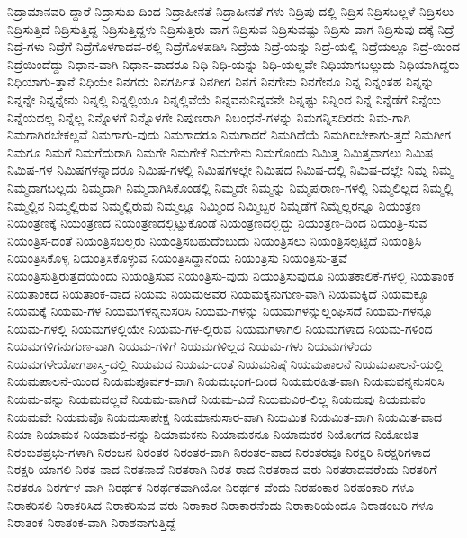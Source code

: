 {ನಿದ್ರಾಮಾನವರಿ-ದ್ದಾರೆ
ನಿದ್ರಾಸುಖ-ದಿಂದ
ನಿದ್ರಾಹೀನತೆ
ನಿದ್ರಾಹೀನತೆ-ಗಳು
ನಿದ್ರಿಪು-ದಲ್ಲಿ
ನಿದ್ರಿಸ
ನಿದ್ರಿಸಬಲ್ಲಳೆ
ನಿದ್ರಿಸಲು
ನಿದ್ರಿಸುತ್ತಿದೆ
ನಿದ್ರಿಸುತ್ತಿದ್ದ
ನಿದ್ರಿಸುತ್ತಿದ್ದಳು
ನಿದ್ರಿಸುತ್ತಿರು-ವಾಗ
ನಿದ್ರಿಸುವ
ನಿದ್ರಿಸುವಷ್ಟು
ನಿದ್ರಿಸು-ವಾಗ
ನಿದ್ರಿಸುವು-ದಕ್ಕೆ
ನಿದ್ರೆ
ನಿದ್ರೆ-ಗಳು
ನಿದ್ರೆಗೆ
ನಿದ್ರೆಗೊಳಗಾದವ-ರಲ್ಲಿ
ನಿದ್ರೆಗೊಳಪಡಿಸಿ
ನಿದ್ರೆಯ
ನಿದ್ರೆ-ಯನ್ನು
ನಿದ್ರೆ-ಯಲ್ಲಿ
ನಿದ್ರೆಯಲ್ಲೂ
ನಿದ್ರೆ-ಯಿಂದ
ನಿದ್ರೆಯಿಂದೆದ್ದು
ನಿಧಾನ-ವಾಗಿ
ನಿಧಾನ-ವಾದರೂ
ನಿಧಿ
ನಿಧಿ-ಯನ್ನು
ನಿಧಿ-ಯಲ್ಲವೇ
ನಿಧಿಯಾಗಬಲ್ಲುದು
ನಿಧಿಯಾಗಿದ್ದರು
ನಿಧಿಯಾಗು-ತ್ತಾನೆ
ನಿಧಿಯೇ
ನಿನಗದು
ನಿನಗರ್ಪಿತ
ನಿನಗೀಗ
ನಿನಗೆ
ನಿನಗೇನು
ನಿನಗೇನೂ
ನಿನ್ನ
ನಿನ್ನಂತಹ
ನಿನ್ನನ್ನು
ನಿನ್ನನ್ನೇ
ನಿನ್ನನ್ನೇನು
ನಿನ್ನಲ್ಲಿ
ನಿನ್ನಲ್ಲಿಯೂ
ನಿನ್ನಲ್ಲಿವೆಯೆ
ನಿನ್ನವನುನಿನ್ನವನೇ
ನಿನ್ನಷ್ಟು
ನಿನ್ನಿಂದ
ನಿನ್ನೆ
ನಿನ್ನೆಡೆಗೆ
ನಿನ್ನೆಯ
ನಿನ್ನೆಯದಲ್ಲ
ನಿನ್ನೆಲ್ಲ
ನಿನ್ನೊಳಗೆ
ನಿನ್ನೊಳಗೇ
ನಿಪುಣರಾಗಿ
ನಿಬಂಧನೆ-ಗಳನ್ನು
ನಿಮಗನ್ನಿಸದಿರದು
ನಿಮ-ಗಾಗಿ
ನಿಮಗಾಗಿರಬೇಕಲ್ಲವೆ
ನಿಮಗಾಗು-ವುದು
ನಿಮಗಾದರೂ
ನಿಮಗಾದರೆ
ನಿಮಗಿದೆಯೆ
ನಿಮಗಿರಬೇಕಾಗು-ತ್ತದೆ
ನಿಮಗೀಗ
ನಿಮಗೂ
ನಿಮಗೆ
ನಿಮಗೆದುರಾಗಿ
ನಿಮಗೇ
ನಿಮಗೇಕೆ
ನಿಮಗೇನು
ನಿಮಗೊಂದು
ನಿಮಿತ್ತ
ನಿಮಿತ್ತವಾಗಲು
ನಿಮಿಷ
ನಿಮಿಷ-ಗಳ
ನಿಮಿಷಗಳನ್ನಾದರೂ
ನಿಮಿಷ-ಗಳಲ್ಲಿ
ನಿಮಿಷಗಳಲ್ಲೇ
ನಿಮಿಷದ
ನಿಮಿಷ-ದಲ್ಲಿ
ನಿಮಿಷ-ದಲ್ಲೇ
ನಿಮ್ನ
ನಿಮ್ಮ
ನಿಮ್ಮದಾಗಬಲ್ಲದು
ನಿಮ್ಮದಾಗಿ
ನಿಮ್ಮದಾಗಿಸಿಕೊಂಡಲ್ಲಿ
ನಿಮ್ಮದೇ
ನಿಮ್ಮನ್ನು
ನಿಮ್ಮಪುರಾಣ-ಗಳಲ್ಲಿ
ನಿಮ್ಮಲಿಲ್ಲದ
ನಿಮ್ಮಲ್ಲಿ
ನಿಮ್ಮಲ್ಲಿನ
ನಿಮ್ಮಲ್ಲಿರುವ
ನಿಮ್ಮಲ್ಲಿರುವು
ನಿಮ್ಮಲ್ಲೂ
ನಿಮ್ಮಿಂದ
ನಿಮ್ಮಿಬ್ಬರ
ನಿಮ್ಮೆಡೆಗೆ
ನಿಮ್ಮೆಲ್ಲರನ್ನೂ
ನಿಯಂತ್ರಣ
ನಿಯಂತ್ರಣಕ್ಕೆ
ನಿಯಂತ್ರಣದ
ನಿಯಂತ್ರಣದಲ್ಲಿಟ್ಟುಕೊಂಡೆ
ನಿಯಂತ್ರಣದಲ್ಲಿದ್ದು
ನಿಯಂತ್ರಣ-ದಿಂದ
ನಿಯಂತ್ರಿ-ಸುವ
ನಿಯಂತ್ರಿಸ-ದಂತೆ
ನಿಯಂತ್ರಿಸಬಲ್ಲರು
ನಿಯಂತ್ರಿಸಬಹುದೆಂಬುದು
ನಿಯಂತ್ರಿಸಲು
ನಿಯಂತ್ರಿಸಲ್ಪಟ್ಟಿದೆ
ನಿಯಂತ್ರಿಸಿ
ನಿಯಂತ್ರಿಸಿಕೊಳ್ಳ
ನಿಯಂತ್ರಿಸಿಕೊಳ್ಳುವ
ನಿಯಂತ್ರಿಸಿದ್ದಾನೆಂದು
ನಿಯಂತ್ರಿಸು
ನಿಯಂತ್ರಿಸು-ತ್ತವೆ
ನಿಯಂತ್ರಿಸುತ್ತಿರುತ್ತದೆಯೆಂದು
ನಿಯಂತ್ರಿಸುವ
ನಿಯಂತ್ರಿಸು-ವುದು
ನಿಯಂತ್ರಿಸುವುದೂ
ನಿಯತಕಾಲಿಕೆ-ಗಳಲ್ಲಿ
ನಿಯತಾಂಕ
ನಿಯತಾಂಕದ
ನಿಯತಾಂಕ-ವಾದ
ನಿಯಮ
ನಿಯಮಅವರ
ನಿಯಮಕ್ಕನುಗುಣ-ವಾಗಿ
ನಿಯಮಕ್ಕಿದೆ
ನಿಯಮಕ್ಕೂ
ನಿಯಮಕ್ಕೆ
ನಿಯಮ-ಗಳ
ನಿಯಮಗಳನ್ನನುಸರಿಸಿ
ನಿಯಮ-ಗಳನ್ನು
ನಿಯಮಗಳನ್ನುಲ್ಲಂಘಿಸದೆ
ನಿಯಮ-ಗಳನ್ನೂ
ನಿಯಮ-ಗಳಲ್ಲಿ
ನಿಯಮಗಳಲ್ಲಿಯೇ
ನಿಯಮ-ಗಳ-ಲ್ಲಿರುವ
ನಿಯಮಗಳಾಗಲಿ
ನಿಯಮಗಳಾದ
ನಿಯಮ-ಗಳಿಂದ
ನಿಯಮಗಳಿಗನುಗುಣ-ವಾಗಿ
ನಿಯಮ-ಗಳಿಗೆ
ನಿಯಮಗಳಿಲ್ಲದ
ನಿಯಮ-ಗಳು
ನಿಯಮಗಳೆಂದು
ನಿಯಮಗಳೇಯೋಗಶಾಸ್ತ್ರ-ದಲ್ಲಿ
ನಿಯಮದ
ನಿಯಮ-ದಂತೆ
ನಿಯಮನಿಷ್ಠೆ
ನಿಯಮಪಾಲನೆ
ನಿಯಮಪಾಲನೆ-ಯಲ್ಲಿ
ನಿಯಮಪಾಲನೆ-ಯಿಂದ
ನಿಯಮಪೂರ್ವಕ-ವಾಗಿ
ನಿಯಮಭಂಗ-ದಿಂದ
ನಿಯಮರಹಿತ-ವಾಗಿ
ನಿಯಮವನ್ನನುಸರಿಸಿ
ನಿಯಮ-ವನ್ನು
ನಿಯಮವಲ್ಲವೆ
ನಿಯಮ-ವಾಗಿದೆ
ನಿಯಮ-ವಿದೆ
ನಿಯಮವಿರ-ಲಿಲ್ಲ
ನಿಯಮವು
ನಿಯಮವೆಂ
ನಿಯಮವೇ
ನಿಯಮವೊ
ನಿಯಮಸಾಪೇಕ್ಷ
ನಿಯಮಾನುಸಾರ-ವಾಗಿ
ನಿಯಮಿತ
ನಿಯಮಿತ-ವಾಗಿ
ನಿಯಮಿತ-ವಾದ
ನಿಯಾ
ನಿಯಾಮಕ
ನಿಯಾಮಕ-ನನ್ನು
ನಿಯಾಮಕನು
ನಿಯಾಮಕನೂ
ನಿಯಾಮಕರ
ನಿಯೋಗದ
ನಿಯೋಜಿತ
ನಿರಂಕುಶಪ್ರಭು-ಗಳಾಗಿ
ನಿರಂಜನ
ನಿರಂತರ
ನಿರಂತರ-ವಾಗಿ
ನಿರಂತರ-ವಾದ
ನಿರಂತರವೂ
ನಿರಕ್ಷರಿ
ನಿರಕ್ಷರಿಗಳಾದ
ನಿರಕ್ಷರಿ-ಯಾಗಲಿ
ನಿರತ-ನಾದ
ನಿರತನಾದೆ
ನಿರತರಾಗಿ
ನಿರತ-ರಾದ
ನಿರತರಾದ-ವರು
ನಿರತರಾದವರೆಂದು
ನಿರತರಿಗೆ
ನಿರತರೂ
ನಿರರ್ಗಳ-ವಾಗಿ
ನಿರರ್ಥಕ
ನಿರರ್ಥಕವಾಗಿಯೋ
ನಿರರ್ಥಕ-ವೆಂದು
ನಿರಹಂಕಾರ
ನಿರಹಂಕಾರಿ-ಗಳೂ
ನಿರಾಕರಿಸಲಿ
ನಿರಾಕರಿಸಿದ
ನಿರಾಕರಿಸುವ-ವರು
ನಿರಾಕಾರ
ನಿರಾಕಾರನೆಂದು
ನಿರಾಕಾರಿಯೆಂದೂ
ನಿರಾಡಂಬರಿ-ಗಳೂ
ನಿರಾತಂಕ
ನಿರಾತಂಕ-ವಾಗಿ
ನಿರಾಶನಾಗುತ್ತಿದ್ದೆ
}
